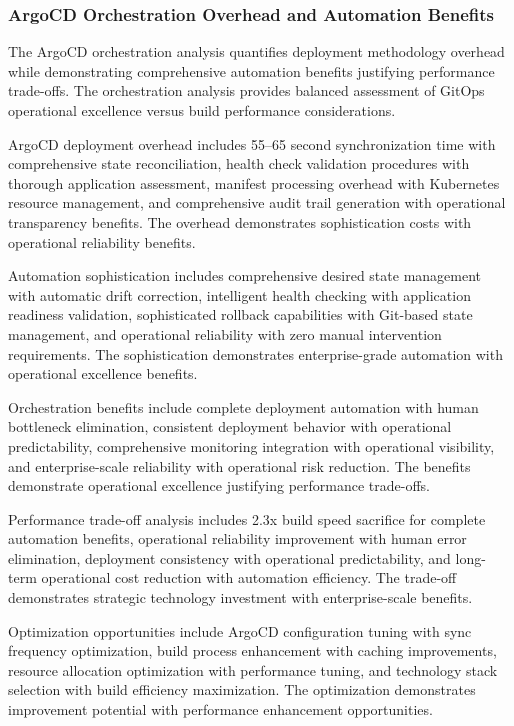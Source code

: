 \subsubsection{ArgoCD Orchestration Overhead and Automation Benefits}

The ArgoCD orchestration analysis quantifies deployment methodology overhead while demonstrating comprehensive automation benefits justifying performance trade-offs. The orchestration analysis provides balanced assessment of GitOps operational excellence versus build performance considerations.

ArgoCD deployment overhead includes 55--65 second synchronization time with comprehensive state reconciliation, health check validation procedures with thorough application assessment, manifest processing overhead with Kubernetes resource management, and comprehensive audit trail generation with operational transparency benefits. The overhead demonstrates sophistication costs with operational reliability benefits.

Automation sophistication includes comprehensive desired state management with automatic drift correction, intelligent health checking with application readiness validation, sophisticated rollback capabilities with Git-based state management, and operational reliability with zero manual intervention requirements. The sophistication demonstrates enterprise-grade automation with operational excellence benefits.

Orchestration benefits include complete deployment automation with human bottleneck elimination, consistent deployment behavior with operational predictability, comprehensive monitoring integration with operational visibility, and enterprise-scale reliability with operational risk reduction. The benefits demonstrate operational excellence justifying performance trade-offs.

Performance trade-off analysis includes 2.3x build speed sacrifice for complete automation benefits, operational reliability improvement with human error elimination, deployment consistency with operational predictability, and long-term operational cost reduction with automation efficiency. The trade-off demonstrates strategic technology investment with enterprise-scale benefits.

Optimization opportunities include ArgoCD configuration tuning with sync frequency optimization, build process enhancement with caching improvements, resource allocation optimization with performance tuning, and technology stack selection with build efficiency maximization. The optimization demonstrates improvement potential with performance enhancement opportunities.

